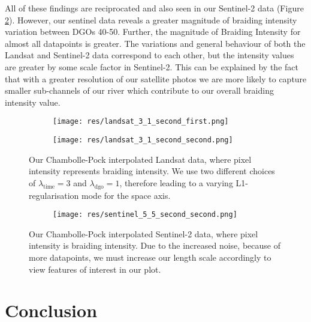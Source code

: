 \documentclass[12pt]{article}
\begin{document}
All of these findings are reciprocated and also seen in our Sentinel-2 data (Figure \ref{fig:sentinel_5_5_second_second}). However, our sentinel data reveals a greater magnitude of braiding intensity variation between DGOs 40-50. Further, the magnitude of Braiding Intensity for almost all datapoints is greater. The variations and general behaviour of both the Landsat and Sentinel-2 data correspond to each other, but the intensity values are greater by some scale factor in Sentinel-2. This can be explained by the fact that with a greater resolution of our satellite photos we are more likely to capture smaller sub-channels of our river which contribute to our overall braiding intensity value.

\begin{figure}
    \centering
    \begin{subfigure}[t]{0.95\textwidth}
        \centering
        \texttt{[image: res/landsat\_3\_1\_second\_first.png]}
    \end{subfigure}
    \begin{subfigure}[t]{0.95\textwidth}
        \centering
        \texttt{[image: res/landsat\_3\_1\_second\_second.png]}
    \end{subfigure}
    \caption{Our Chambolle-Pock interpolated Landsat data, where pixel intensity represents braiding intensity. We use two different choices of $\lambda_\text{time} = 3$ and $\lambda_\text{dgo} = 1$, therefore leading to a varying L1-regularisation mode for the space axis.}
    \label{fig:landsat_3_1_second_first}
\end{figure}

\begin{figure}
    \centering
    \begin{subfigure}[t]{0.95\textwidth}
        \centering
        \texttt{[image: res/sentinel\_5\_5\_second\_second.png]}
    \end{subfigure}
    \caption{Our Chambolle-Pock interpolated Sentinel-2 data, where pixel intensity is braiding intensity. Due to the increased noise, because of more datapoints, we must increase our length scale accordingly to view features of interest in our plot.}
    \label{fig:sentinel_5_5_second_second}
\end{figure}

\section{Conclusion}
\end{document}
